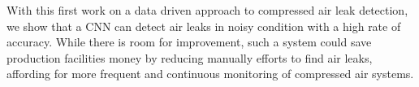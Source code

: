 With this first work on a data driven approach to compressed air leak detection, we show that a CNN can detect air leaks in noisy condition with a high rate of accuracy. While there is room for improvement, such a system could save production facilities money by reducing manually efforts to find air leaks, affording for more frequent and continuous monitoring of compressed air systems.